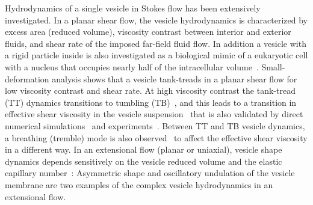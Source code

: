 \documentclass[prf,superscriptaddress,showpacs]{revtex4-1}
\begin{document}
Hydrodynamics of a single vesicle in Stokes flow has been extensively
investigated. In a planar shear flow, the vesicle hydrodynamics is
characterized by excess area (reduced volume), viscosity contrast
between interior and exterior fluids, and shear rate of the imposed
far-field fluid flow. In addition a vesicle with a rigid particle inside
is also investigated as a biological mimic of a eukaryotic cell with a
nucleus that occupies nearly half of the intracellular
volume~\cite{Veerapaneni2011_PRL}. Small-deformation analysis shows that
a vesicle tank-treads in a planar shear flow for low viscosity contrast
and shear rate. At high viscosity contrast the tank-tread (TT) dynamics
transitions to tumbling (TB)~\cite{Misbah2006_PRL, Vlahovska2007_PRE},
and this leads to a transition in effective shear viscosity in the
vesicle suspension~\cite{Misbah2006_PRL,Vitkova2008_BJ} that is also
validated by direct numerical
simulations~\cite{GhigliottiBibenMisbah2010_JFM} and
experiments~\cite{KantslerSegreSteinberg2008_EPL,
ZabuskySegreDeschamps2011_PoF}.  Between TT and TB vesicle dynamics, a breathing (tremble) mode is also
observed~\cite{Misbah2006_PRL,KantslerSegreSteinberg2008_PRL,
ZhaoShaqfeh2011_JFM, SpannZhaoShaqfeh2014_PoF} to affect the effective
shear viscosity in a different way.  In an extensional flow (planar or
uniaxial), vesicle shape dynamics depends sensitively on the vesicle
reduced volume  and the elastic capillary
number~\cite{KantslerSegreSteinberg2008_PRL, ZhaoShaqfeh2013_JFM,
Narsimhan2014_JFM, DahlNarsimhanGouveia2016_SoftMatt}: Asymmetric shape
and oscillatory undulation of the vesicle membrane are two examples of
the complex vesicle hydrodynamics in an extensional flow.
\end{document}
